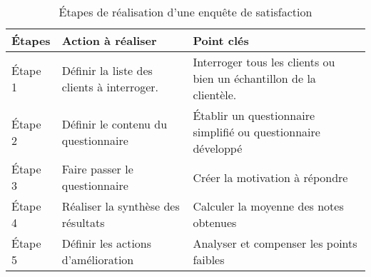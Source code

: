             \begin{longtable}{p{2cm} p{5cm} p{6cm}}
                \caption{Étapes de réalisation d’une enquête de satisfaction}
                \label{table:etapeDeRealistaionEnqSatisfat}
                \\\hline\hline
                    \textbf{Étapes} & \textbf{Action à réaliser} & \textbf{Point cl{\'e}s}
                \\\hline\hline
                    Étape 1 & Définir la liste des clients à interroger.
                    & Interroger tous les clients ou bien un échantillon de la clientèle.
                    \\
                    Étape 2 & Définir le contenu du questionnaire & Établir
                    un questionnaire simplifié ou questionnaire développé
                    \\
                    Étape 3 & Faire passer le questionnaire & Créer la motivation à répondre
                    \\
                    Étape 4 & Réaliser la synthèse des résultats & Calculer la moyenne des notes
                    obtenues
                    \\
                    Étape 5 & Définir les actions d’amélioration & Analyser et compenser les points
                    faibles 
                \\\bottomrule
            \end{longtable}

